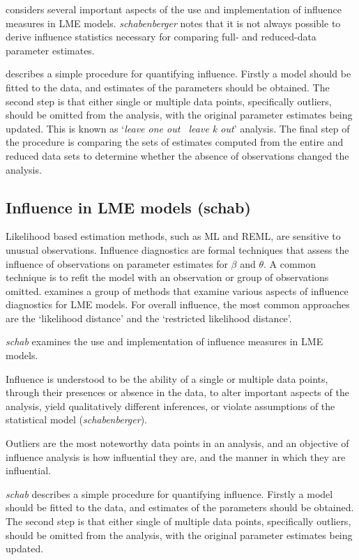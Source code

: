 \documentclass[12pt, a4paper]{report}
\theoremstyle{plain}
\theoremstyle{definition}
\theoremstyle{remark}
\begin{document}
\citet{schab} considers several important aspects of the use and implementation of influence measures in LME models. \textit{schabenberger} notes that it is not always possible to
derive influence statistics necessary for comparing full- and reduced-data parameter estimates. 

\citet{schab} describes a simple procedure for quantifying influence. Firstly a model should be fitted to the data, and
estimates of the parameters should be obtained. The second step is that either single or multiple data points, specifically outliers,
should be omitted from the analysis, with the original parameter estimates being updated. This is known as `\textit{leave one out \ leave k out}' analysis. The final step of the procedure is comparing the 	sets of estimates computed from the entire and reduced data sets to determine whether the absence of observations changed the
analysis.		


\subsection{Influence in LME models (schab)}
Likelihood based estimation methods, such as ML and REML, are sensitive to unusual observations. Influence diagnostics are formal techniques that assess the influence of observations on parameter estimates for $\beta$ and $\theta$. A common technique is to refit the model with an observation or group of observations omitted.\citet{west} examines a group of methods that examine various aspects of influence diagnostics for LME models.
For overall influence, the most common approaches are the `likelihood distance' and the `restricted likelihood distance'.

\emph{schab} examines the use and implementation of influence measures in LME models.

Influence is understood to be the ability of a single or multiple
data points, through their presences or absence in the data, to
alter important aspects of the analysis, yield qualitatively
different inferences, or violate assumptions of the statistical
model (\textit{schabenberger}).

Outliers are the most noteworthy data points in an analysis, and
an objective of influence analysis is how influential they are,
and the manner in which they are influential.

\emph{schab} describes a simple procedure for quantifying
influence. Firstly a model should be fitted to the data, and
estimates of the parameters should be obtained. The second step is
that either single of multiple data points, specifically outliers,
should be omitted from the analysis, with the original parameter
estimates being updated. 
\end{document}
